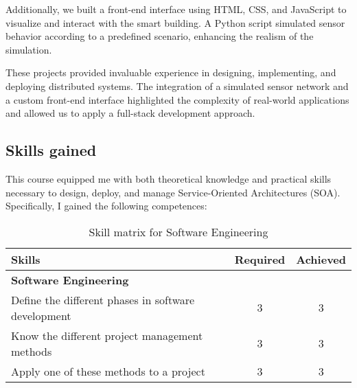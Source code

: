 \noindent Additionally, we built a front-end interface using HTML, CSS, and JavaScript to visualize and interact with the smart building. A Python script simulated sensor behavior according to a predefined scenario, enhancing the realism of the simulation.
\vspace{0.25cm}

\noindent These projects provided invaluable experience in designing, implementing, and deploying distributed systems. The integration of a simulated sensor network and a custom front-end interface highlighted the complexity of real-world applications and allowed us to apply a full-stack development approach.

\subsection{Skills gained}
\indent \indent This course equipped me with both theoretical knowledge and practical skills necessary to design, deploy, and manage Service-Oriented Architectures (SOA). Specifically, I gained the following competences:

\begin{table}[h!]
    \centering
    \renewcommand{\arraystretch}{1.5} %
    \begin{tabular}{|p{11cm}|c|c|}
    \hline
    \rowcolor[gray]{0.8}
    \textbf{Skills} & \textbf{Required} & \textbf{Achieved} \\ \hline
    \rowcolor[gray]{0.9} \textbf{Software Engineering} &  &  \\ \hline
    Define the different phases in software development & 3 & 3 \\ \hline
    Know the different project management methods & 3 & 3 \\ \hline
    Apply one of these methods to a project & 3 & 3 \\ \hline
    \end{tabular}
    \caption{Skill matrix for Software Engineering}
    \label{table:skills-software-engineering}
\end{table}

